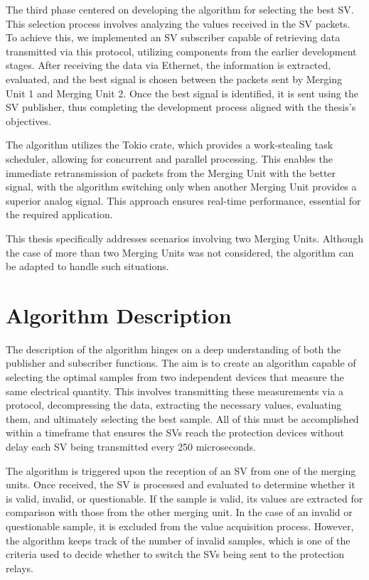 The third phase centered on developing the algorithm for selecting the best SV. This selection process involves analyzing the values received in the SV packets. To achieve this, we implemented an SV subscriber capable of retrieving data transmitted via this protocol, utilizing components from the earlier development stages. After receiving the data via Ethernet, the information is extracted, evaluated, and the best signal is chosen between the packets sent by Merging Unit 1 and Merging Unit 2. Once the best signal is identified, it is sent using the SV publisher, thus completing the development process aligned with the thesis's objectives.

The algorithm utilizes the Tokio crate, which provides a work-stealing task scheduler, allowing for concurrent and parallel processing. This enables the immediate retransmission of packets from the Merging Unit with the better signal, with the algorithm switching only when another Merging Unit provides a superior analog signal. This approach ensures real-time performance, essential for the required application.

This thesis specifically addresses scenarios involving two Merging Units. Although the case of more than two Merging Units was not considered, the algorithm can be adapted to handle such situations.
	
\section{Algorithm Description}

The description of the algorithm hinges on a deep understanding of both the publisher and subscriber functions. The aim is to create an algorithm capable of selecting the optimal samples from two independent devices that measure the same electrical quantity. This involves transmitting these measurements via a protocol, decompressing the data, extracting the necessary values, evaluating them, and ultimately selecting the best sample. All of this must be accomplished within a timeframe that ensures the SVs reach the protection devices without delay each SV being transmitted every 250 microseconds.

The algorithm is triggered upon the reception of an SV from one of the merging units. Once received, the SV is processed and evaluated to determine whether it is valid, invalid, or questionable. If the sample is valid, its values are extracted for comparison with those from the other merging unit. In the case of an invalid or questionable sample, it is excluded from the value acquisition process. However, the algorithm keeps track of the number of invalid samples, which is one of the criteria used to decide whether to switch the SVs being sent to the protection relays.

